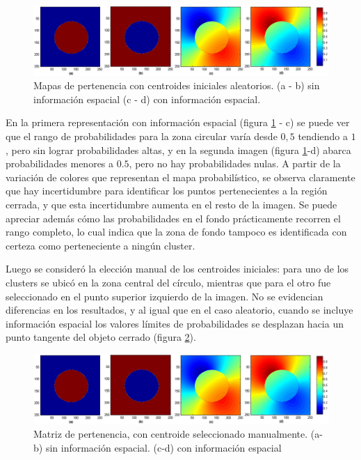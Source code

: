 \begin{figure}[H]
\centering
\includegraphics[scale=0.08]{images/circulo-001.jpg}
\caption{Mapas de pertenencia con centroides iniciales aleatorios. (a - b)  sin información espacial (c - d) con información espacial.}
\label{fig:circulo_aleatorio}
\end{figure}

En la primera representación con información espacial (figura \ref{fig:circulo_aleatorio} - c) se puede ver que el rango de probabilidades para la zona circular varía desde $0,5$ tendiendo a $1$, pero sin lograr probabilidades altas, y en la segunda imagen (figura \ref{fig:circulo_aleatorio}-d) abarca probabilidades menores a $0.5$, pero no hay probabilidades nulas. A partir de la variación de colores que representan el mapa probabilístico, se observa claramente que hay incertidumbre para identificar los puntos pertenecientes a la región cerrada, y que esta incertidumbre aumenta en el resto de la imagen. Se puede apreciar además cómo las probabilidades en el fondo prácticamente recorren el rango completo, lo cual indica que la zona de fondo tampoco  es identificada con certeza como perteneciente a ningún cluster.

Luego se consideró la elección manual de los centroides iniciales: para uno de los clusters se ubicó en la zona central del círculo, mientras que para el otro fue seleccionado en el punto superior izquierdo de la imagen. No se evidencian diferencias en los resultados, y al igual que en el caso aleatorio, cuando se incluye información espacial los valores límites de probabilidades se desplazan hacia un punto tangente del objeto cerrado (figura \ref{fig:circulo_aleatorio_centr_manual}).

\begin{figure}[H]
\centering
\includegraphics[scale=0.08]{images/circulo-001.jpg}
\caption{Matriz de pertenencia, con centroide seleccionado manualmente. (a-b) sin información espacial. (c-d) con información espacial}
\label{fig:circulo_aleatorio_centr_manual}
\end{figure}

